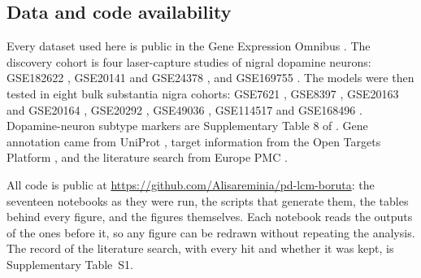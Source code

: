 \documentclass[11pt,a4paper]{article}
\begin{document}
\subsection*{Data and code availability}

Every dataset used here is public in the Gene Expression Omnibus \citep{barrett2013}. The discovery
cohort is four laser-capture studies of nigral dopamine neurons: GSE182622 \citep{tiklova2021}, GSE20141
and GSE24378 \citep{zheng2010}, and GSE169755 \citep{zaccaria2022}. The models were then tested in eight
bulk substantia nigra cohorts: GSE7621 \citep{lesnick2007}, GSE8397 \citep{moran2006}, GSE20163 and
GSE20164 \citep{zheng2010}, GSE20292 \citep{zhang2005}, GSE49036 \citep{dijkstra2015}, GSE114517
\citep{simchovitz2020} and GSE168496 \citep{tranchevent2023}. Dopamine-neuron subtype markers are
Supplementary Table 8 of \citet{kamath2022}. Gene annotation came from UniProt \citep{uniprot2025}, target
information from the Open Targets Platform \citep{buniello2025}, and the literature search from Europe PMC
\citep{europepmc2024}.

All code is public at \url{https://github.com/Alisareminia/pd-lcm-boruta}: the seventeen notebooks as they
were run, the scripts that generate them, the tables behind every figure, and the figures themselves. Each
notebook reads the outputs of the ones before it, so any figure can be redrawn without repeating the
analysis. The record of the literature search, with every hit and whether it was kept, is Supplementary
Table~S1.

\printbibliography[title={References}]

\clearpage


\end{document}
